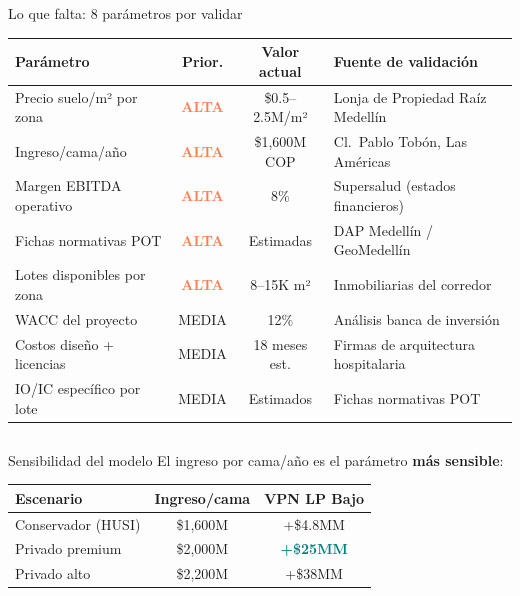 \documentclass[aspectratio=169, 11pt]{beamer}
\newcommand{\highlight}[1]{\textcolor{teal}{\textbf{#1}}}
\newcommand{\danger}[1]{\textcolor{coral}{\textbf{#1}}}
\begin{document}
{
\begin{frame}{Lo que falta: 8 parámetros por validar}

{\footnotesize
\begin{tabular}{@{}p{4.0cm}ccl@{}}
\toprule
\textbf{Parámetro} & \textbf{Prior.} & \textbf{Valor actual} & \textbf{Fuente de validación} \\
\midrule
\rowcolor{coral!8}
Precio suelo/m² por zona & \danger{ALTA} & \$0.5--2.5M/m² & Lonja de Propiedad Raíz Medellín \\
\rowcolor{coral!8}
Ingreso/cama/año & \danger{ALTA} & \$1,600M COP & Cl.\ Pablo Tobón, Las Américas \\
\rowcolor{coral!6}
Margen EBITDA operativo & \danger{ALTA} & 8\% & Supersalud (estados financieros) \\
Fichas normativas POT & \danger{ALTA} & Estimadas & DAP Medellín / GeoMedellín \\
Lotes disponibles por zona & \danger{ALTA} & 8--15K m² & Inmobiliarias del corredor \\
\rowcolor{amber!10}
WACC del proyecto & MEDIA & 12\% & Análisis banca de inversión \\
\rowcolor{amber!10}
Costos diseño + licencias & MEDIA & 18 meses est. & Firmas de arquitectura hospitalaria \\
IO/IC específico por lote & MEDIA & Estimados & Fichas normativas POT \\
\bottomrule
\end{tabular}
}

\vspace{8pt}
\begin{columns}[T]
\begin{alertblock}{\small Sensibilidad del modelo}
\footnotesize El ingreso por cama/año es el parámetro \textbf{más sensible}:

\vspace{3pt}
{\scriptsize
\begin{tabular}{@{}lcc@{}}
\toprule
\textbf{Escenario} & \textbf{Ingreso/cama} & \textbf{VPN LP Bajo} \\
\midrule
\rowcolor{coral!6}
Conservador (HUSI) & \$1,600M & +\$4.8MM \\
\rowcolor{teal!6}
Privado premium & \$2,000M & \highlight{+\$25MM} \\
Privado alto & \$2,200M & +\$38MM \\
\bottomrule
\end{tabular}
}
\end{alertblock}


\end{columns}
\end{frame}}
\end{document}
